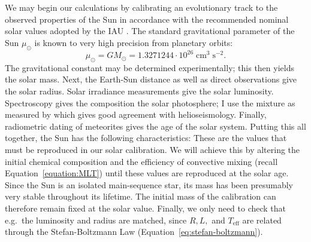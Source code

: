 We may begin our calculations by calibrating an evolutionary track to the observed properties of the Sun \citep[e.g.][]{1982MNRAS.199..735C} in accordance with the recommended nominal solar values adopted by the IAU \citep{2015arXiv151007674M}. 
The standard gravitational parameter of the Sun $\mu_\odot$ is known to very high precision from planetary orbits: 
\begin{equation*}
    \mu_\odot = GM_\odot = 1.3271244 \cdot 10^{26} \; \text{cm}^3 \; \text{s}^{-2}.
\end{equation*}
The gravitational constant may be determined experimentally; this then yields the solar mass. 
Next, the Earth-Sun distance as well as direct observations give the solar radius. 
Solar irradiance measurements give the solar luminosity. 
Spectroscopy gives the composition the solar photosphere; I use the mixture as measured by \citet[][hereinafter \textsc{GS98}]{1998SSRv...85..161G} which gives good agreement with helioseismology. 
Finally, radiometric dating of meteorites gives the age of the solar system. 
Putting this all together, the Sun has the following characteristics: 
These are the values that must be reproduced in our solar calibration. 
We will achieve this by altering the initial chemical composition and the efficiency of convective mixing (recall Equation~\ref{equation:MLT}) until these values are reproduced at the solar age. 
Since the Sun is an isolated main-sequence star, its mass has been presumably very stable throughout its lifetime. 
The initial mass of the calibration can therefore remain fixed at the solar value. 
Finally, we only need to check that e.g.~the luminosity and radius are matched, since $R, L,$ and $T_{\text{eff}}$ are related through the Stefan-Boltzmann Law (Equation~\ref{eq:stefan-boltzmann}).

